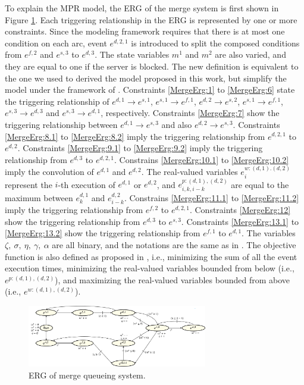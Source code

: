 \documentclass[]{interact}
\theoremstyle{plain}%
\theoremstyle{definition}
\theoremstyle{remark}
\begin{document}
To explain the MPR model, the ERG of the merge system is first shown in Figure \ref{fig:ERG_merge}. Each triggering relationship in the ERG is represented by one or more constraints. Since the modeling framework requires that there is at most one condition on each arc, event $e^{d,2,1}$ is introduced to split the composed conditions from $e^{f,2}$ and $e^{s,3}$ to $e^{d,3}$. The state variables $m^1$ and $m^2$ are also varied, and they are equal to one if the server is blocked. The new definition is equivalent to the one we used to derived the model proposed in this work, but simplify the model under the framework of \cite{chan2008optimization}. Constraints \eqref{MergeErg:1} to \eqref{MergeErg:6} state the triggering relationship of $e^{d,1}\rightarrow e^{s,1}$, $e^{s,1}\rightarrow e^{f,1}$, $e^{d,2}\rightarrow e^{s,2}$, $e^{s,1}\rightarrow e^{f,1}$, $e^{s,3}\rightarrow e^{d,3}$ and $e^{s,3}\rightarrow e^{d,1}$, respectively. Constraints \eqref{MergeErg:7} show the triggering relationship between $e^{d,1}\rightarrow e^{s,3}$ and also $e^{d,2}\rightarrow e^{s,3}$. Constraints \eqref{MergeErg:8.1} to \eqref{MergeErg:8.2} imply the triggering relationship from $e^{d,2,1}$ to $e^{d,2}$. Constraints \eqref{MergeErg:9.1} to \eqref{MergeErg:9.2} imply the triggering relationship from $e^{d,3}$ to $e^{d,2,1}$. Constrains \eqref{MergeErg:10.1} to \eqref{MergeErg:10.2} imply the convolution of $e^{d,1}$ and $e^{d,2}$. The real-valued variables $e^{w:(d,1).(d,2)}_i$ represent the $i$-th execution of $e^{d,1}$ or $e^{d,2}$, and $e^{p:(d,1),(d,2)}_{i,k,i-k}$ are equal to the maximum between $e^{d,1}_k$ and $e^{d,2}_{i-k}$. Constrains \eqref{MergeErg:11.1} to \eqref{MergeErg:11.2} imply the triggering relationship from $e^{f,2}$ to $e^{d,2,1}$. Constraints \eqref{MergeErg:12} show the triggering relationship from $e^{d,3}$ to $e^{s,3}$. Constraints \eqref{MergeErg:13.1} to \eqref{MergeErg:13.2} show the triggering relationship from $e^{f,1}$ to $e^{d,1}$. The variables $\zeta,\ \sigma,\ \eta,\ \gamma,\ \alpha$ are all binary, and the notations are the same as in \cite{chan2008optimization}. The objective function is also defined as proposed in \cite{chan2008optimization}, i.e., minimizing the sum of all the event execution times, minimizing the real-valued variables bounded from below (i.e., $e^{p:(d,1),(d,2)}$), and maximizing the real-valued variables bounded from above (i.e., $e^{w:(d,1),(d,2)}$).

\begin{figure}[h]
	\centering
	\includegraphics[width=0.7\textwidth]{Figures/ERG_merge.png}
	\caption{ERG of merge queueing system.}
	\label{fig:ERG_merge}
\end{figure}
\end{document}
